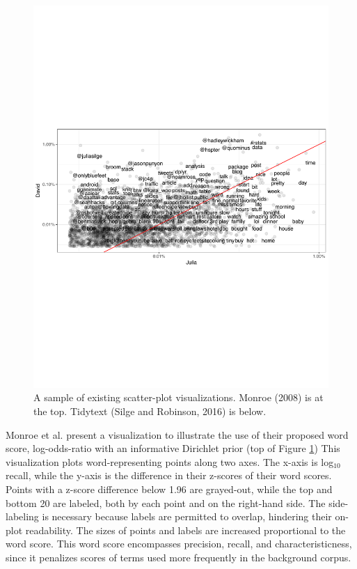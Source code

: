 \documentclass[11pt]{article}
\begin{document}
\begin{figure}[h]
\includegraphics[width=\columnwidth]{tidytext}
\vspace{-0.8cm}
\caption{A sample of existing scatter-plot visualizations. Monroe (2008) is at the top. Tidytext (Silge and Robinson, 2016) is below.} 
\vspace{-0.5cm}
\label{scatters}
\end{figure}

Monroe et al.  present a visualization to illustrate the use of their proposed word score, log-odds-ratio with an informative Dirichlet prior (top of Figure \ref{scatters})  This visualization plots word-representing points along two axes.  The x-axis is log$_{10}$ recall, while the y-axis is the difference in their z-scores of their word scores.  Points with a z-score difference below 1.96 are grayed-out, while the top and bottom 20 are labeled, both by each point and on the right-hand side.  The side-labeling is necessary because labels are permitted to overlap, hindering their on-plot readability.  The sizes of points and labels are increased  proportional to the word score. This word score encompasses precision, recall, and characteristicness, since it penalizes scores of terms used more frequently in the background corpus. 
\end{document}

